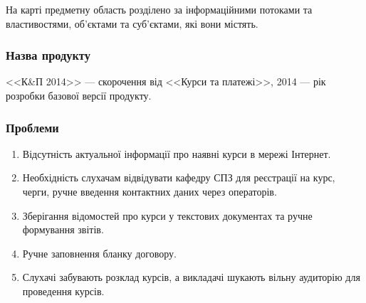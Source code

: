 \begin{figure}[t]
\end{figure}
\suppressfloats[t]

На карті предметну область розділено за інформаційними потоками та властивостями, об'єктами та суб'єктами, які вони містять.
\bigbreak
\subsubsection{Назва продукту}
\bigbreak
<<К\&П 2014>> --- скорочення від <<Курси та платежі>>, 2014 --- рік розробки базової версії продукту.
\bigbreak
\subsubsection{Проблеми}
\bigbreak
\begin{enumerate}
 \item Відсутність актуальної інформації про наявні курси в мережі Інтернет.
 \item Необхідність слухачам відвідувати кафедру СПЗ для реєстрації на курс, черги, ручне введення контактних даних через операторів.
 \item Зберігання відомостей про курси у текстових документах та ручне формування звітів.
 \item Ручне заповнення бланку договору.
 \item Слухачі забувають розклад курсів, а викладачі шукають вільну аудиторію для проведення курсів.
\end{enumerate}

\newpage
\par \mbox{\ \ \ } \par
\newpage
